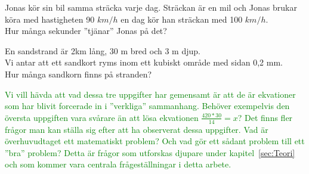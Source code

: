 
\begin{displayquote}
\textcolor{turkos}{Jonas kör sin bil samma sträcka varje dag. Sträckan är en mil och Jonas brukar köra med hastigheten 90 $km/h$ en dag kör han sträckan med 100 $km/h$. \\
Hur många sekunder ''tjänar'' Jonas på det?}
\end{displayquote}




\begin{displayquote}
\textcolor{turkos}{En sandstrand är 2km lång, 30 m bred och 3 m djup. \\
Vi antar att ett sandkort ryms inom ett kubiskt område med sidan 0,2 mm.\\
Hur många sandkorn finns på stranden?}
\end{displayquote}

\noindent \textcolor{green}{Vi vill hävda att vad dessa tre uppgifter har gemensamt är att de är ekvationer som har blivit forcerade in i ''verkliga'' sammanhang. Behöver exempelvis den översta uppgiften vara svårare än att lösa ekvationen $\frac{420*30}{14} = x$? Det finns fler frågor man kan ställa sig efter att ha observerat dessa uppgifter. Vad är överhuvudtaget ett matematiskt problem? Och vad gör ett sådant problem till ett ''bra'' problem? Detta är frågor som utforskas djupare under kapitel~\ref{sec:Teori} och som kommer vara centrala frågeställningar i detta arbete.
}



